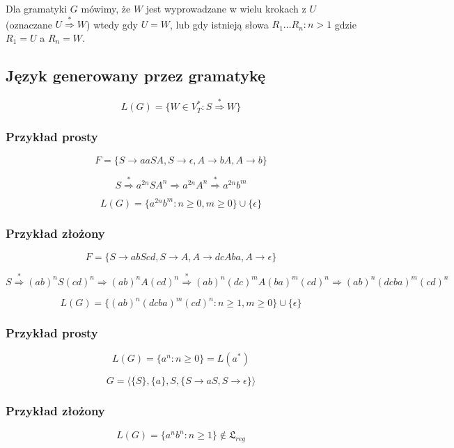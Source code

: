 \documentclass{../notatki}
\begin{document}
Dla gramatyki $G$ mówimy, że $W$ jest wyprowadzane w wielu krokach z
$U$ (oznaczane $U \stackrel{*}{\Rightarrow} W$) wtedy gdy $U=W$, lub
gdy istnieją słowa $R_1 \dots R_n : n > 1$ gdzie $R_1 = U$ a $R_n=W$.

\subsection{Język generowany przez gramatykę}

$$
L(G) = \{W \in V_T^* : S \stackrel{*}{\Rightarrow} W\}
$$

\subsubsection{Przykład prosty}

$$
F = \{S \rightarrow aaSA, S \rightarrow \epsilon, A \rightarrow bA, A
\rightarrow b \}
$$

$$
S \stackrel{*}{\Rightarrow} a^{2n}SA^n \Rightarrow a^{2n}A^n
\stackrel{*}{\Rightarrow} a^{2n}b^m
$$

$$
L(G) = \{a^{2n}b^m : n \ge 0, m \ge 0\} \cup \{\epsilon\}
$$

\subsubsection{Przykład złożony}

$$
F = \{S \rightarrow abScd, S \rightarrow A, A \rightarrow dcAba, A
\rightarrow \epsilon\}
$$

$$
S \stackrel{*}{\Rightarrow} (ab)^nS(cd)^n \Rightarrow (ab)^nA(cd)^n
\stackrel{*}{\Rightarrow} (ab)^n(dc)^mA(ba)^m(cd)^n \Rightarrow
(ab)^n(dcba)^m(cd)^n
$$

$$
L(G) = \{(ab)^n(dcba)^m(cd)^n : n \ge 1, m \ge 0\} \cup \{\epsilon\}
$$

\subsubsection{Przykład prosty}

$$
L(G) = \{a^n : n \ge 0\} = L(a^*)
$$

$$
G = \langle \{S\}, \{a\}, S, \{S \rightarrow aS, S \rightarrow
\epsilon\} \rangle
$$

\subsubsection{Przykład złożony}

$$
L(G) = \{a^nb^n : n \ge 1\} \notin \mathfrak{L}_{reg}
$$
\end{document}

